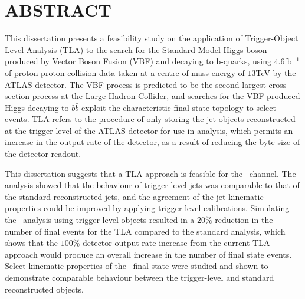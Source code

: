 \chapter*{ABSTRACT}


This dissertation presents a feasibility study on the application of Trigger-Object Level Analysis (TLA) to the search for the Standard Model Higgs boson produced by Vector Boson Fusion (VBF) and decaying to b-quarks, using $4.6$fb$^{-1}$ of proton-proton collision data taken at a centre-of-mass energy of $13$TeV by the ATLAS detector. The VBF process is predicted to be the second largest cross-section process at the Large Hadron Collider, and searches for the VBF produced Higgs decaying to $b\bar{b}$ exploit the characteristic final state topology to select events. TLA refers to the procedure of only storing the jet objects reconstructed at the trigger-level of the ATLAS detector for use in analysis, which permits an increase in the output rate of the detector, as a result of reducing the byte size of the detector readout.

This dissertation suggests that a TLA approach is feasible for the \VBFHBB\ channel. The analysis showed that the behaviour of trigger-level jets was comparable to that of the standard reconstructed jets, and the agreement of the jet kinematic properties     could be improved by applying trigger-level calibrations. Simulating the \VBFHBB\ analysis using trigger-level objects resulted in a $20\%$ reduction in the number of final events for the TLA compared to the standard analysis, which shows that the $100\%$ detector output rate increase from the current TLA approach would produce an overall increase in the number of final state events. Select kinematic properties of the \VBFHBB\ final state were studied and shown to demonstrate comparable behaviour between the trigger-level and standard reconstructed objects.

\cleardoublepage

\endinput
